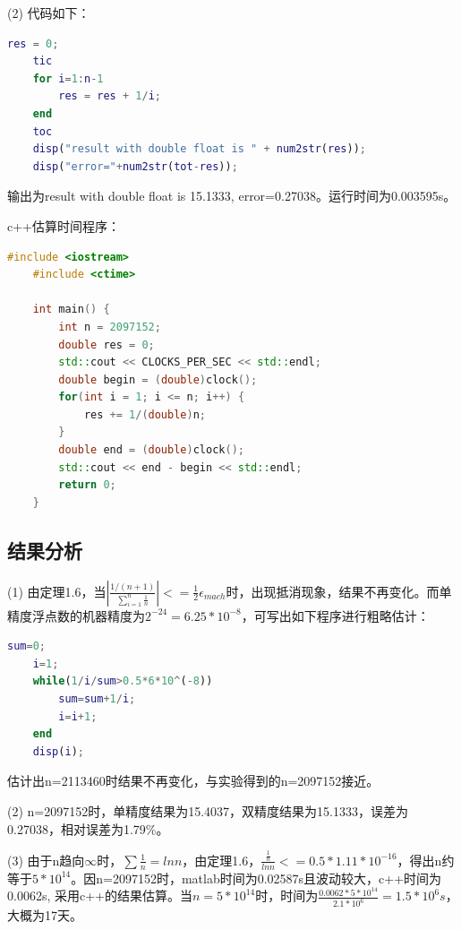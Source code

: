 \documentclass[12pt, utf8, hyperref]{article}
\begin{document}
(2) 代码如下：
\begin{lstlisting}[language=matlab]
    res = 0;
    tic
    for i=1:n-1
        res = res + 1/i;
    end
    toc
    disp("result with double float is " + num2str(res));
    disp("error="+num2str(tot-res));
\end{lstlisting}
输出为result with double float is 15.1333, error=0.27038。运行时间为0.003595s。

c++估算时间程序：
\begin{lstlisting}[language=c++]
    #include <iostream>
    #include <ctime>
    
    int main() {
        int n = 2097152;
        double res = 0;
        std::cout << CLOCKS_PER_SEC << std::endl;
        double begin = (double)clock();
        for(int i = 1; i <= n; i++) {
            res += 1/(double)n;
        }
        double end = (double)clock();
        std::cout << end - begin << std::endl;
        return 0;
    }
\end{lstlisting}

\subsection*{结果分析}
(1) 由定理1.6，当$|\frac{1/(n+1)}{\sum_{i=1}^{n}\frac{1}{n}}| <= \frac{1}{2}\epsilon_{mach}$时，出现抵消现象，结果不再变化。而单精度浮点数的机器精度为$2^{-24}=6.25*10^{-8}$，可写出如下程序进行粗略估计：
\begin{lstlisting}[language=matlab]
    sum=0;
    i=1;
    while(1/i/sum>0.5*6*10^(-8))
        sum=sum+1/i;
        i=i+1; 
    end
    disp(i);
\end{lstlisting}
估计出n=2113460时结果不再变化，与实验得到的n=2097152接近。

(2) n=2097152时，单精度结果为15.4037，双精度结果为15.1333，误差为0.27038，相对误差为1.79\%。

(3) 由于n趋向$\infty$时，$\sum\frac{1}{n} = lnn$，由定理1.6，$\frac{\frac{1}{n}}{lnn}<= 0.5*1.11*10^{-16}$，得出n约等于$5*10^{14}$。因n=2097152时，matlab时间为0.02587s且波动较大，c++时间为0.0062s, 采用c++的结果估算。当$n=5*10^{14}$时，时间为$\frac{0.0062*5*10^{14}}{2.1*10^{6}}=1.5*10^{6}s$，大概为17天。
\end{document}
